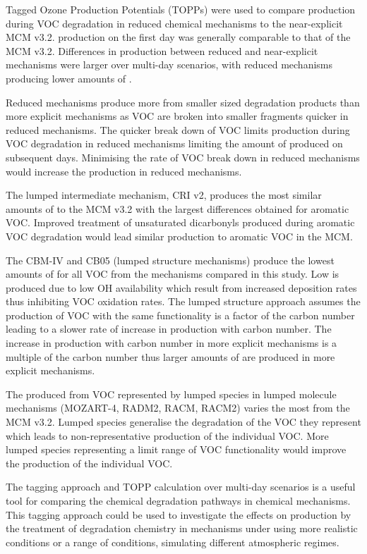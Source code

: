 Tagged Ozone Production Potentials (TOPPs) were used to compare  production during VOC degradation in reduced chemical mechanisms to the near-explicit MCM v3.2. 
 production on the first day was generally comparable to that of the MCM v3.2.
Differences in  production between reduced and near-explicit mechanisms were larger over multi-day scenarios, with reduced mechanisms producing lower amounts of .

Reduced mechanisms produce more  from smaller sized degradation products than more explicit mechanisms as VOC are broken into smaller fragments quicker in reduced mechanisms.
The quicker break down of VOC limits  production during VOC degradation in reduced mechanisms limiting the amount of  produced on subsequent days.
Minimising the rate of VOC break down in reduced mechanisms would increase the  production in reduced mechanisms.

The lumped intermediate mechanism, CRI v2, produces the most similar amounts of  to the MCM v3.2 with the largest differences obtained for aromatic VOC.
Improved treatment of unsaturated dicarbonyls produced during aromatic VOC degradation would lead similar  production to aromatic VOC in the MCM.

The CBM-IV and CB05 (lumped structure mechanisms) produce the lowest amounts of  for all VOC from the mechanisms compared in this study.
Low  is produced due to low OH availability which result from increased  deposition rates thus inhibiting VOC oxidation rates.
The lumped structure approach assumes the  production of VOC with the same functionality is a factor of the carbon number leading to a slower rate of increase in  production with carbon number.
The increase in  production with carbon number in more explicit mechanisms is a multiple of the carbon number thus larger amounts of  are produced in more explicit mechanisms.

The  produced from VOC represented by lumped species in lumped molecule mechanisms (MOZART-4, RADM2, RACM, RACM2) varies the most from the MCM v3.2.
Lumped species generalise the degradation of the VOC they represent which leads to non-representative  production of the individual VOC.
More lumped species representing a limit range of VOC functionality would improve the  production of the individual VOC.

The tagging approach and TOPP calculation over multi-day scenarios is a useful tool for comparing the chemical degradation pathways in chemical mechanisms. 
This tagging approach could be used to investigate the effects on  production by the treatment of degradation chemistry in mechanisms under using more realistic  conditions or a range of  conditions, simulating different atmospheric regimes. 
